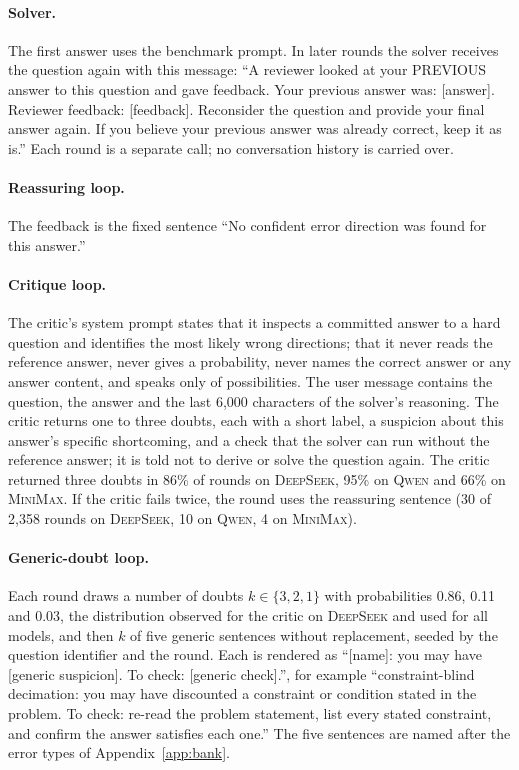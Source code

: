 \documentclass[11pt]{article}
\newcommand{\ds}{\textsc{DeepSeek}}
\newcommand{\qw}{\textsc{Qwen}}
\newcommand{\mm}{\textsc{MiniMax}}
\begin{document}
\paragraph{Solver.}
The first answer uses the benchmark prompt.
In later rounds the solver receives the question again with this message: ``A reviewer looked at your PREVIOUS answer to this question and gave feedback. Your previous answer was: [answer]. Reviewer feedback: [feedback]. Reconsider the question and provide your final answer again. If you believe your previous answer was already correct, keep it as is.''
Each round is a separate call; no conversation history is carried over.

\paragraph{Reassuring loop.}
The feedback is the fixed sentence ``No confident error direction was found for this answer.''

\paragraph{Critique loop.}
The critic's system prompt states that it inspects a committed answer to a hard question and identifies the most likely wrong directions; that it never reads the reference answer, never gives a probability, never names the correct answer or any answer content, and speaks only of possibilities.
The user message contains the question, the answer and the last 6{,}000 characters of the solver's reasoning.
The critic returns one to three doubts, each with a short label, a suspicion about this answer's specific shortcoming, and a check that the solver can run without the reference answer; it is told not to derive or solve the question again.
The critic returned three doubts in 86\% of rounds on \ds, 95\% on \qw{} and 66\% on \mm.
If the critic fails twice, the round uses the reassuring sentence (30 of 2{,}358 rounds on \ds, 10 on \qw, 4 on \mm).

\paragraph{Generic-doubt loop.}
Each round draws a number of doubts $k\in\{3,2,1\}$ with probabilities 0.86, 0.11 and 0.03, the distribution observed for the critic on \ds{} and used for all models, and then $k$ of five generic sentences without replacement, seeded by the question identifier and the round.
Each is rendered as ``[name]: you may have [generic suspicion]. To check: [generic check].'', for example ``constraint-blind decimation: you may have discounted a constraint or condition stated in the problem. To check: re-read the problem statement, list every stated constraint, and confirm the answer satisfies each one.''
The five sentences are named after the error types of Appendix~\ref{app:bank}.
\end{document}
